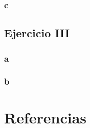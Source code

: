 \documentclass{article}
\begin{document}
\subsubsection*{c}

\subsection*{Ejercicio III}

\subsubsection*{a}

\subsubsection*{b}

\section*{Referencias}
\end{document}
